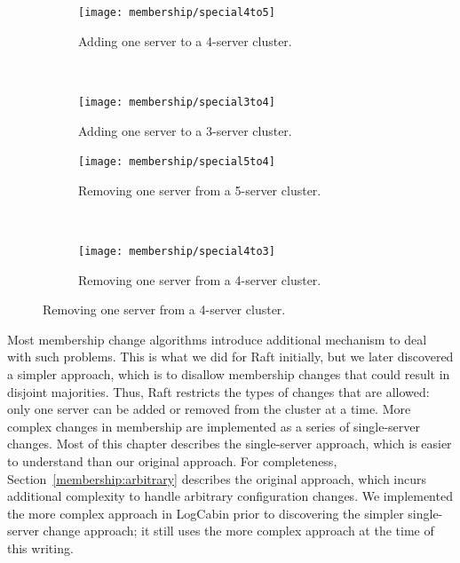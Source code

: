 \begin{figure}
\centering

\begin{subfigure}{.45\textwidth}
\centering
\texttt{[image: membership/special4to5]}
\caption{
Adding one server to a 4-server cluster.
}
\end{subfigure}
~
\begin{subfigure}{.45\textwidth}
\centering
\texttt{[image: membership/special3to4]}
\caption{
Adding one server to a 3-server cluster.
}
\end{subfigure}

\vspace{3ex}

\begin{subfigure}{.45\textwidth}
\centering
\texttt{[image: membership/special5to4]}
\caption{
Removing one server from a 5-server cluster.
}
\end{subfigure}
~
\begin{subfigure}{.45\textwidth}
\centering
\texttt{[image: membership/special4to3]}
\caption{
Removing one server from a 4-server cluster.
}
\end{subfigure}

\label{fig:membership:special}
\end{figure}

Most membership change algorithms introduce additional mechanism to deal
with such problems. This is what we did for Raft initially, but we later
discovered a simpler approach, which is to disallow membership changes
that could result in disjoint majorities. Thus, Raft restricts the types
of changes that are allowed: only one server can be added or removed
from the cluster at a time. More complex changes in membership are
implemented as a series of single-server changes. Most of this chapter
describes the single-server approach, which is easier to understand than
our original approach. For completeness,
Section~\ref{membership:arbitrary} describes the original approach,
which incurs additional complexity to handle arbitrary configuration
changes. We implemented the more complex approach in LogCabin prior to
discovering the simpler single-server change approach; it still uses the
more complex approach at the time of this writing.

